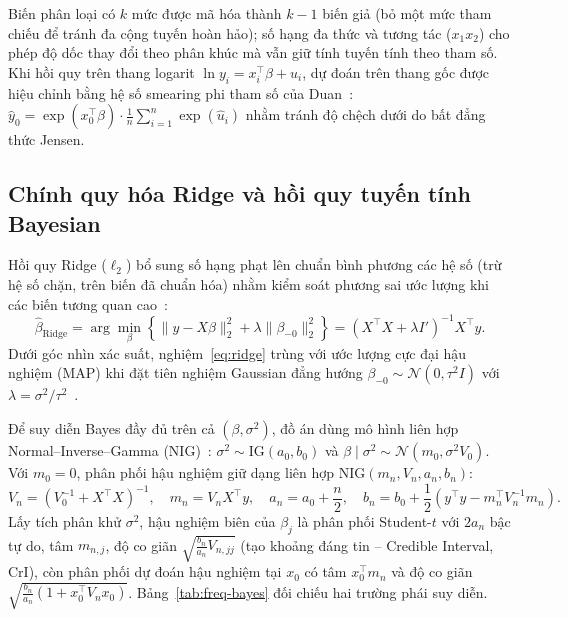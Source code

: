 Biến phân loại có $k$ mức được mã hóa thành $k-1$ biến giả (bỏ một mức tham chiếu để tránh đa cộng tuyến hoàn hảo); số hạng đa thức và tương tác ($x_1 x_2$) cho phép độ dốc thay đổi theo phân khúc mà vẫn giữ tính tuyến tính theo tham số. Khi hồi quy trên thang logarit $\ln y_i = x_i^\top \beta + u_i$, dự đoán trên thang gốc được hiệu chỉnh bằng hệ số smearing phi tham số của Duan~\cite{duan1983smearing}: $\hat y_0 = \exp(x_0^\top \hat\beta) \cdot \frac{1}{n}\sum_{i=1}^n \exp(\hat u_i)$ nhằm tránh độ chệch dưới do bất đẳng thức Jensen.

\subsection{Chính quy hóa Ridge và hồi quy tuyến tính Bayesian}
Hồi quy Ridge ($\ell_2$) bổ sung số hạng phạt lên chuẩn bình phương các hệ số (trừ hệ số chặn, trên biến đã chuẩn hóa) nhằm kiểm soát phương sai ước lượng khi các biến tương quan cao~\cite{hastie2009esl}:
\begin{equation}
  \hat\beta_{\mathrm{Ridge}} = \arg\min_\beta \left\{ \lVert y - X\beta \rVert_2^2 + \lambda \lVert \beta_{-0} \rVert_2^2 \right\} = (X^\top X + \lambda I')^{-1} X^\top y.
  \label{eq:ridge}
\end{equation}
Dưới góc nhìn xác suất, nghiệm~\eqref{eq:ridge} trùng với ước lượng cực đại hậu nghiệm (MAP) khi đặt tiên nghiệm Gaussian đẳng hướng $\beta_{-0} \sim \mathcal{N}(0, \tau^2 I)$ với $\lambda = \sigma^2 / \tau^2$~\cite[Mục~3.3]{bishop2006prml}.

Để suy diễn Bayes đầy đủ trên cả $(\beta, \sigma^2)$, đồ án dùng mô hình liên hợp Normal--Inverse--Gamma (NIG)~\cite{bishop2006prml}: $\sigma^2 \sim \mathrm{IG}(a_0, b_0)$ và $\beta \mid \sigma^2 \sim \mathcal{N}(m_0, \sigma^2 V_0)$. Với $m_0 = 0$, phân phối hậu nghiệm giữ dạng liên hợp $\mathrm{NIG}(m_n, V_n, a_n, b_n)$:
\begin{equation}
  V_n = (V_0^{-1} + X^\top X)^{-1}, \quad
  m_n = V_n X^\top y, \quad
  a_n = a_0 + \frac{n}{2}, \quad
  b_n = b_0 + \frac{1}{2}\!\left(y^\top y - m_n^\top V_n^{-1} m_n\right).
  \label{eq:nig-post}
\end{equation}
Lấy tích phân khử $\sigma^2$, hậu nghiệm biên của $\beta_j$ là phân phối Student-$t$ với $2a_n$ bậc tự do, tâm $m_{n,j}$, độ co giãn $\sqrt{\frac{b_n}{a_n}V_{n,jj}}$ (tạo khoảng đáng tin -- Credible Interval, CrI), còn phân phối dự đoán hậu nghiệm tại $x_0$ có tâm $x_0^\top m_n$ và độ co giãn $\sqrt{\frac{b_n}{a_n}(1 + x_0^\top V_n x_0)}$. Bảng~\ref{tab:freq-bayes} đối chiếu hai trường phái suy diễn.

